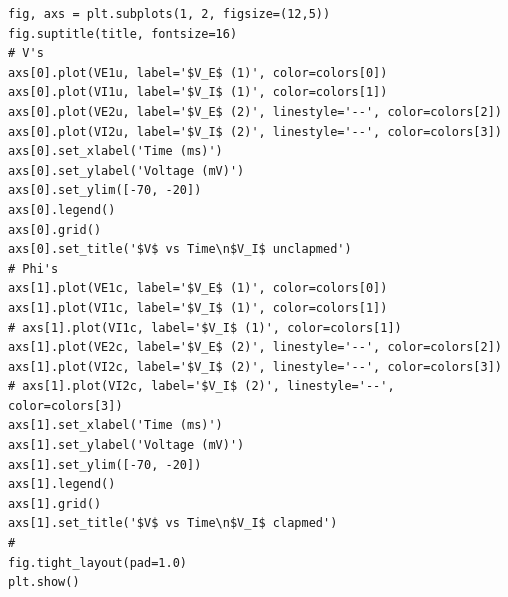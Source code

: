 \documentclass[10pt,twocolumn]{article}
\begin{document}
\begin{verbatim}
fig, axs = plt.subplots(1, 2, figsize=(12,5))
fig.suptitle(title, fontsize=16)
# V's
axs[0].plot(VE1u, label='$V_E$ (1)', color=colors[0])
axs[0].plot(VI1u, label='$V_I$ (1)', color=colors[1])
axs[0].plot(VE2u, label='$V_E$ (2)', linestyle='--', color=colors[2])
axs[0].plot(VI2u, label='$V_I$ (2)', linestyle='--', color=colors[3])
axs[0].set_xlabel('Time (ms)')
axs[0].set_ylabel('Voltage (mV)')
axs[0].set_ylim([-70, -20])
axs[0].legend()
axs[0].grid()
axs[0].set_title('$V$ vs Time\n$V_I$ unclapmed')
# Phi's
axs[1].plot(VE1c, label='$V_E$ (1)', color=colors[0])
axs[1].plot(VI1c, label='$V_I$ (1)', color=colors[1])
# axs[1].plot(VI1c, label='$V_I$ (1)', color=colors[1])
axs[1].plot(VE2c, label='$V_E$ (2)', linestyle='--', color=colors[2])
axs[1].plot(VI2c, label='$V_I$ (2)', linestyle='--', color=colors[3])
# axs[1].plot(VI2c, label='$V_I$ (2)', linestyle='--', color=colors[3])
axs[1].set_xlabel('Time (ms)')
axs[1].set_ylabel('Voltage (mV)')
axs[1].set_ylim([-70, -20])
axs[1].legend()
axs[1].grid()
axs[1].set_title('$V$ vs Time\n$V_I$ clapmed')
# 
fig.tight_layout(pad=1.0)
plt.show()

\end{verbatim}
\end{document}
